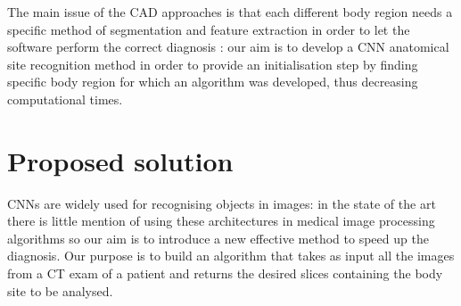 \documentclass[../main.tex]{subfiles}
\begin{document}
\vspace{5mm}

The main issue of the CAD approaches is that each different body region needs a specific method of segmentation and feature extraction in order to let the software perform the correct diagnosis \cite{Yan2016}: our aim is to develop a CNN anatomical site recognition method in order to provide an initialisation step by finding specific body region for which an algorithm was developed, thus decreasing computational times.

\section{Proposed solution}
CNNs are widely used for recognising objects in images: in the state of the art there is little mention of using these architectures in medical image processing algorithms so our aim is to introduce a new effective method to speed up the diagnosis.
Our purpose is to build an algorithm that takes as input all the images from a CT exam of a patient and returns the desired slices containing the body site to be analysed.

\vspace{5mm}
\end{document}
